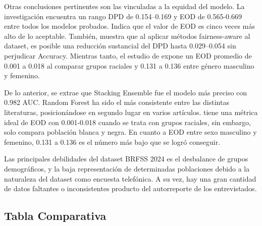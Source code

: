 \documentclass[conference]{IEEEtran}
\begin{document}
Otras conclusiones pertinentes son las vinculadas a la equidad del modelo. La investigación \cite{farquhar2026persistent} encuentra un rango DPD de 0.154–0.169 y EOD de 0.565-0.669 entre todos los modelos probados. Indica que el valor de EOD es cinco veces más alto de lo aceptable. También, muestra que  al aplicar métodos fairness-aware al dataset, es posible una reducción sustancial del DPD hasta 0.029–0.054 sin perjudicar Accuracy. Mientras tanto, el estudio de \cite{li2023evaluating} expone un EOD promedio de 0.001 a 0.018 al comparar grupos raciales y 0.131 a 0.136 entre género masculino y femenino.

De lo anterior, se extrae que Stacking Ensemble fue el modelo más preciso con 0.982 AUC. Random Forest ha sido el más consistente entre las distintas literaturas, posicionándose en segundo lugar en varios artículos. \cite{li2023evaluating} tiene una métrica ideal de EOD con 0.001-0.018 cuando se trata con grupos raciales, sin embargo, solo compara población blanca y negra. En cuanto a EOD entre sexo masculino y femenino, 0.131 a 0.136 es el número más bajo que se logró conseguir. 

Las principales debilidades del dataset BRFSS 2024 es el desbalance de grupos demográficos, y la baja representación de determinadas poblaciones debido a la naturaleza del dataset como encuesta telefónica. A su vez, hay una gran cantidad de datos faltantes o inconsistentes producto del autorreporte de los entrevistados.

\subsection{Tabla Comparativa}
\end{document}
